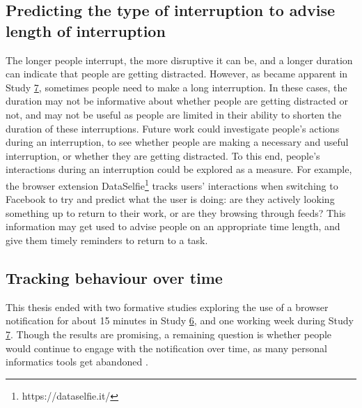 \subsection{Predicting the type of interruption to advise length of interruption}
The longer people interrupt, the more disruptive it can be, and a longer duration can indicate that people are getting distracted. However, as became apparent in Study \hyperref[st:Study7]{7}, sometimes people need to make a long interruption. In these cases, the duration may not be informative about whether people are getting distracted or not, and may not be useful as people are limited in their ability to shorten the duration of these interruptions. Future work could investigate people's actions during an interruption, to see whether people are making a necessary and useful interruption, or whether they are getting distracted. To this end, people's interactions during an interruption could be explored as a measure. For example, the browser extension DataSelfie\footnote{https://dataselfie.it/} tracks users' interactions when switching to Facebook to try and predict what the user is doing: are they actively looking something up to return to their work, or are they browsing through feeds? This information may get used to advise people on an appropriate time length, and give them timely reminders to return to a task. 



\subsection{Tracking behaviour over time}
This thesis ended with two formative studies exploring the use of a browser notification for about 15 minutes in Study \hyperref[st:Study6]{6}, and one working week during Study \hyperref[st:Study7]{7}. Though the results are promising, a remaining question is whether people would continue to engage with the notification over time, as many personal informatics tools get abandoned \citep{Lazar2015}. 

